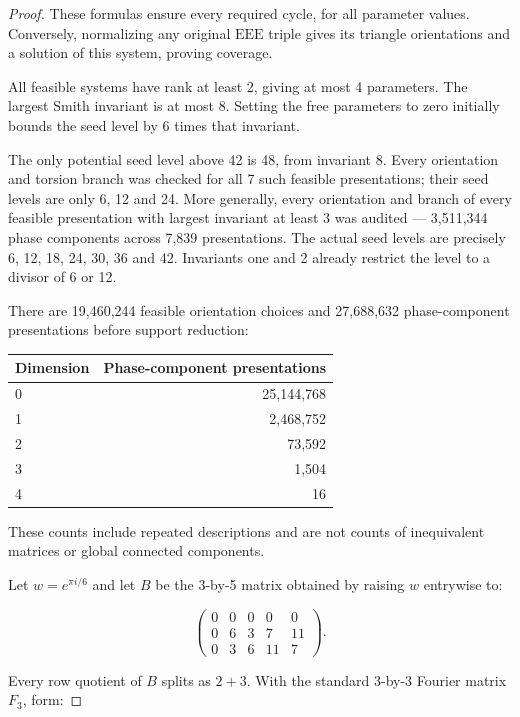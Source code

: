 \documentclass[11pt,a4paper]{article}
\theoremstyle{plain}
\theoremstyle{definition}
\theoremstyle{plain}
\begin{document}
\begin{proof}
These formulas ensure every required cycle, for all parameter values. Conversely, normalizing any original $\mathrm{EEE}$ triple gives its triangle orientations and a solution of this system, proving coverage.

All feasible systems have rank at least 2, giving at most 4 parameters. The largest Smith invariant is at most 8. Setting the free parameters to zero initially bounds the seed level by 6 times that invariant.

The only potential seed level above 42 is 48, from invariant 8. Every orientation and torsion branch was checked for all 7 such feasible presentations; their seed levels are only 6, 12 and 24. More generally, every orientation and branch of every feasible presentation with largest invariant at least 3 was audited --- 3,511,344 phase components across 7,839 presentations. The actual seed levels are precisely 6, 12, 18, 24, 30, 36 and 42. Invariants one and 2 already restrict the level to a divisor of 6 or 12.

There are 19,460,244 feasible orientation choices and 27,688,632 phase-component presentations before support reduction:

\begin{center}
\begin{tabular}{@{}lr@{}}
\toprule
Dimension & Phase-component presentations \\
\midrule


0 & 25,144,768 \\
1 & 2,468,752 \\
2 & 73,592 \\
3 & 1,504 \\
4 & 16 \\
\end{tabular}
\end{center}

These counts include repeated descriptions and are not counts of inequivalent matrices or global connected components.

\medskip
Let $w=e^{\pi i/6}$ and let $B$ be the 3-by-5 matrix obtained by raising $w$ entrywise to:

$$\begin{pmatrix}
0&0&0&0&0\\
0&6&3&7&11\\
0&3&6&11&7
\end{pmatrix}.$$

Every row quotient of $B$ splits as $2+3$. With the standard 3-by-3 Fourier matrix $F_3$, form:


\end{proof}
\end{document}
